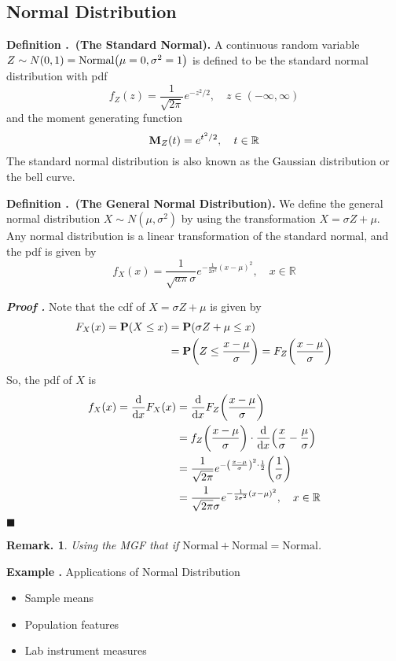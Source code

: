 \documentclass[12pt, a4paper]{article}
\newcounter{index}[subsection]
\newenvironment*{df}[1]{\par\noindent\textbf{Definition \thesubsection.\stepcounter{index}\theindex\ (#1).}}{\par}
\newenvironment*{eg}{\begin{framed}\par\noindent\textbf{Example \thesubsection.\stepcounter{index}\theindex}}{\par\end{framed}}
\newcounter{nprf}[subsection]
\newenvironment*{prf}{\par\indent\textbf{\textit{Proof \stepcounter{nprf}\thenprf.}}}{\hfill$\blacksquare$\par}
\newtheorem*{rmk}{Remark.}
\def\R{\mathbb{R}}
\def\P{\vb{P}}
\def\M{\vb{M}}
\begin{document}
\subsection{Normal Distribution}
\begin{df}{The Standard Normal}
	A continuous random variable $Z\sim N(0,1)=\text{Normal}\qty(\mu=0,\sigma^2=1)$	is defined to be the standard normal distribution with pdf \[f_Z(z)=\dfrac{1}{\sqrt{2\pi}}e^{-z^2/2},\quad z\in(-\infty, \infty)\] and the moment generating function \[\M_Z(t)=e^{t^2/2},\quad t\in\R\] The standard normal distribution is also known as the Gaussian distribution or the bell curve. 
\end{df}
\begin{df}{The General Normal Distribution}
	We define the general normal distribution $X\sim N(\mu,\sigma^2)$ by using the transformation $X=\sigma Z+\mu$. Any normal distribution is a linear transformation of the standard normal, and the pdf is given by \[f_X(x)=\dfrac{1}{\sqrt{a\pi}\sigma}e^{-\frac{1}{2\sigma^2}(x-\mu)^2},\quad x\in\R\]
\end{df}
\begin{prf}
	Note that the cdf of $X=\sigma Z+\mu$ is given by \begin{align*}F_X(x)=\P(X\leq x)&=\P(\sigma Z+\mu\leq x)\\&=\P\qty(Z\leq\dfrac{x-\mu}{\sigma})=F_Z\qty(\dfrac{x-\mu}{\sigma})\end{align*} So, the pdf of $X$ is \begin{align*}f_X(x)=\dv{x}F_X(x)&=\dv{x}F_Z\qty(\dfrac{x-\mu}{\sigma})\\&=f_Z\qty(\dfrac{x-\mu}{\sigma})\cdot\dv{x}\qty(\dfrac{x}{\sigma}-\dfrac{\mu}{\sigma})\\&=\dfrac{1}{\sqrt{2\pi}}e^{-\qty(\frac{x-\mu}{\sigma})^2\cdot\frac{1}{2}}\qty(\dfrac{1}{\sigma})\\&=\dfrac{1}{\sqrt{2\pi}\sigma}e^{-\frac{1}{2\sigma^2}(x-\mu)^2},\quad x\in\R\end{align*}
\end{prf}
\begin{rmk} Using the MGF that if $\mathrm{Normal}+\mathrm{Normal}=\mathrm{Normal}$.\end{rmk}
\begin{eg}{}
	Applications of Normal Distribution
	\begin{itemize}
		\item Sample means
		\item Population features
		\item Lab instrument measures
	\end{itemize}	
\end{eg}
\end{document}
